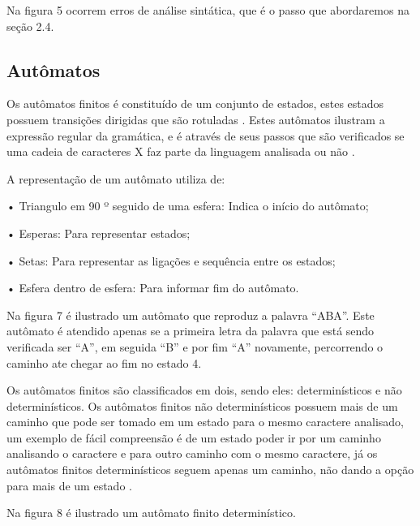 \documentclass[12pt,oneside,a4paper,chapter=TITLE,section=TITLE,sumario=tradicional]{abntex2}
\begin{document}
Na figura 5 ocorrem erros de análise sintática, que é o passo que abordaremos na seção 2.4.

\subsection{Autômatos}
\label{sec:automatos}

Os autômatos finitos é constituído de um conjunto de estados, estes estados possuem transições dirigidas que são rotuladas \cite{pedro2018}. Estes autômatos ilustram a expressão regular da gramática, e é através de seus passos que são verificados se uma cadeia de caracteres X faz parte da linguagem analisada ou não \cite{alfred1995}.

A representação de um autômato utiliza de:

•	Triangulo em 90 º seguido de uma esfera: Indica o início do autômato;

•	Esperas: Para representar estados;

•	Setas: Para representar as ligações e sequência entre os estados;

•	Esfera dentro de esfera: Para informar fim do autômato.

Na figura 7 é ilustrado um autômato que reproduz a palavra “ABA”. Este autômato é atendido apenas se a primeira letra da palavra que está sendo verificada ser “A”, em seguida “B” e por fim “A” novamente, percorrendo o caminho ate chegar ao fim no estado 4.

\begin{figure}[htb]
\end{figure}

Os autômatos finitos são classificados em dois, sendo eles: determinísticos e não determinísticos. Os autômatos finitos não determinísticos possuem mais de um caminho que pode ser tomado em um estado para o mesmo caractere analisado, um exemplo de fácil compreensão é de um estado poder ir por um caminho analisando o caractere e para outro caminho com o mesmo caractere, já os autômatos finitos determinísticos seguem apenas um caminho, não dando a opção para mais de um estado \cite{alfred1995}.

Na figura 8 é ilustrado um autômato finito determinístico.

\begin{figure}[H]
\end{figure}
\end{document}

